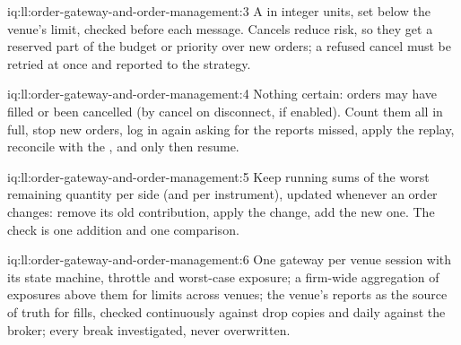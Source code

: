 \begin{solution}{iq:ll:order-gateway-and-order-management:3}
A  in integer units, set below the venue's limit, checked before each message. Cancels reduce risk, so they get a
reserved part of the budget or priority over new orders; a refused cancel must be retried at once and reported to the
strategy.
\end{solution}

\begin{solution}{iq:ll:order-gateway-and-order-management:4}
Nothing certain: orders may have filled or been cancelled (by cancel on disconnect, if enabled). Count them all in full, stop
new orders, log in again asking for the reports missed, apply the replay, reconcile with the , and only then resume.
\end{solution}

\begin{solution}{iq:ll:order-gateway-and-order-management:5}
Keep running sums of the worst remaining quantity per side (and per instrument), updated whenever an order changes: remove its
old contribution, apply the change, add the new one. The check is one addition and one comparison.
\end{solution}

\begin{solution}{iq:ll:order-gateway-and-order-management:6}
One gateway per venue session with its state machine, throttle and worst-case exposure; a firm-wide aggregation of exposures
above them for limits across venues; the venue's reports as the source of truth for fills, checked continuously against drop
copies and daily against the broker; every break investigated, never overwritten.
\end{solution}
